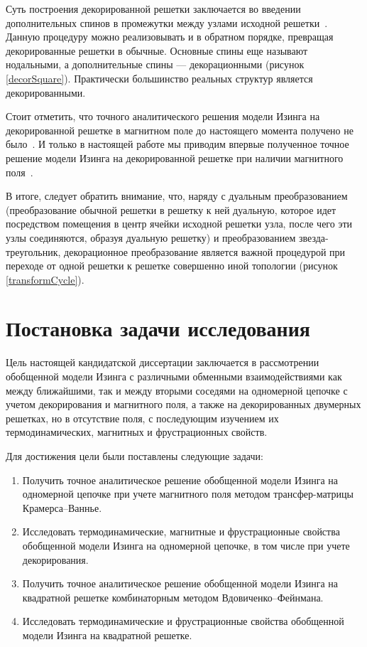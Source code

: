 Суть построения декорированной решетки заключается во введении дополнительных спинов в промежутки между узлами исходной решетки~\cite{siozi_domb1972}. Данную процедуру можно реализовывать и в обратном порядке, превращая декорированные решетки в обычные. Основные спины еще называют нодальными, а дополнительные спины --- декорационными (рисунок \ref{decorSquare}). Практически большинство реальных структур является декорированными.

Стоит отметить, что точного аналитического решения модели Изинга на декорированной решетке в магнитном поле до настоящего момента получено не было~\cite{kassan-ogly2019, proshkin2019, kassan-ogly2020}. И только в настоящей работе мы приводим впервые полученное точное решение модели Изинга на декорированной решетке при наличии магнитного поля~\cite{vakbib2}.

В итоге, следует обратить внимание, что, наряду с дуальным преобразованием (преобразование обычной решетки в решетку к ней дуальную, которое идет посредством помещения в центр ячейки исходной решетки узла, после чего эти узлы соединяются, образуя дуальную решетку) и преобразованием \guillemotleft звезда-треугольник\guillemotright \hspace{1pt}, декорационное преобразование является важной процедурой при переходе от одной решетки к решетке совершенно иной топологии (рисунок \ref{transformCycle}).

\section{Постановка задачи исследования}

Цель настоящей кандидатской диссертации заключается в рассмотрении обобщенной модели Изинга с различными обменными взаимодействиями как между ближайшими, так и между вторыми соседями на одномерной цепочке с учетом декорирования и магнитного поля, а также на декорированных двумерных решетках, но в отсутствие поля, с последующим изучением их термодинамических, магнитных и фрустрационных свойств.

Для достижения цели были поставлены следующие задачи:
\begin{enumerate}
    \item Получить точное аналитическое решение обобщенной модели Изинга на одномерной цепочке при учете магнитного поля методом трансфер-матрицы Крамерса--Ваннье.
    \item Исследовать термодинамические, магнитные и фрустрационные свойства обобщенной модели Изинга на одномерной цепочке, в том числе при учете декорирования.
    \item Получить точное аналитическое решение обобщенной модели Изинга на квадратной решетке комбинаторным методом Вдовиченко--Фейнмана.
    \item Исследовать термодинамические и фрустрационные свойства обобщенной модели Изинга на квадратной решетке.
\end{enumerate}

\FloatBarrier

